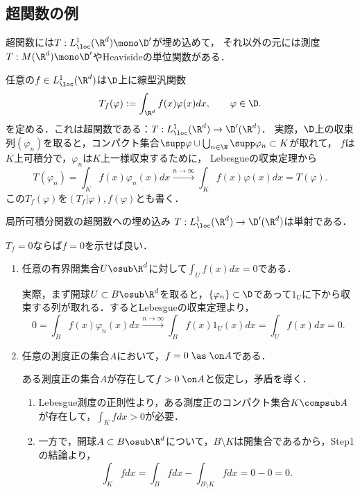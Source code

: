 \documentclass[uplatex,dvipdfmx]{jsreport}
\begin{document}
\subsection{超関数の例}

\begin{tcolorbox}[colframe=ForestGreen, colback=ForestGreen!10!white,breakable,colbacktitle=ForestGreen!40!white,coltitle=black,fonttitle=\bfseries\sffamily,
title=]
    超関数には$T:L^1_\loc(\R^d)\mono\D'$が埋め込めて，
    それ以外の元には測度$T:M(\R^d)\mono\D'$やHeavisideの単位関数がある．
\end{tcolorbox}

\begin{example}[局所可積分関数は超関数である]
    任意の$f\in L^1_\loc(\R^d)$は$\D$上に線型汎関数
    \[T_f(\varphi):=\int_{\R^d}f(x)\varphi(x)dx,\qquad\varphi\in\D.\]
    を定める．これは超関数である：$T:L^1_\loc(\R^d)\to\D'(\R^d)$．
    実際，$\D$上の収束列$(\varphi_n)$を取ると，コンパクト集合$\supp\varphi\cup\bigcup_{n\in\N}\supp\varphi_n\subset K$が取れて，
    $f$は$K$上可積分で，$\varphi_n$は$K$上一様収束するために，
    Lebesgueの収束定理から
    \[T(\varphi_n)=\int_Kf(x)\varphi_n(x)dx\xrightarrow{n\to\infty}\int_Kf(x)\varphi(x)dx=T(\varphi).\]
    この$T_f(\varphi)$を$(T_f|\varphi),f(\varphi)$とも書く．
\end{example}

\begin{proposition}[変分法の基本補題]\label{prop-fundamental-lemma-of-variational-calculus}
    局所可積分関数の超関数への埋め込み
    $T:L^1_\loc(\R^d)\to\D'(\R^d)$は単射である．
\end{proposition}
\begin{Proof}
    $T_f=0$ならば$f=0$を示せば良い．
    \begin{enumerate}[{Step}1]
        \item 任意の有界開集合$U\osub\R^d$に対して$\int_Uf(x)dx=0$である．
        
        実際，まず開球$U\subset B\osub\R^d$を取ると，$\{\varphi_n\}\subset\D$であって$1_U$に下から収束する列が取れる．するとLebesgueの収束定理より，
        \[0=\int_Bf(x)\varphi_n(x)dx\xrightarrow{n\to\infty}\int_Bf(x)1_U(x)dx=\int_Uf(x)dx=0.\]
        \item 任意の測度正の集合$A$において，$f=0\;\as\;\on A$である．
        
        ある測度正の集合$A$が存在して$f>0\;\on A$と仮定し，矛盾を導く．
        \begin{enumerate}
            \item Lebesgue測度の正則性より，ある測度正のコンパクト集合$K\compsub A$が存在して，$\int_Kfdx>0$が必要．
            \item 一方で，開球$A\subset B\osub\R^d$について，$B\setminus K$は開集合であるから，Step1の結論より，
            \[\int_Kfdx=\int_Bfdx-\int_{B\setminus K}fdx=0-0=0.\]
        \end{enumerate}
    \end{enumerate}
\end{Proof}
\end{document}
